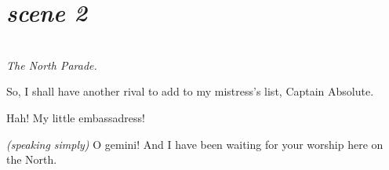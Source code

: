 \documentclass[11pt,a4paper,oneside]{memoir}
\begin{document}
\section*{\hfill\textit{scene 2}}
\begin{description}[itemsep=1ex,leftmargin=1cm]
  \setlength{\parskip}{5pt}

\item[] \hfill \\
  \textit{The North Parade.}

\item[LUCY] So, I shall have another rival to add to my mistress's list, Captain Absolute.

\item[SIR LUCIUS] Hah! My little embassadress!

\item[LUCY] \textit{(speaking simply)} O gemini!  And I have been waiting for your worship here on the North.

\end{description}
\vskip 1cm
\end{document}
